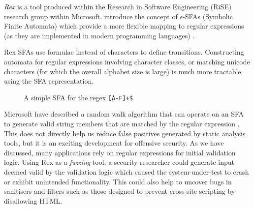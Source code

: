 \documentclass[a4paper,openany,12pt]{book}
\begin{document}
\emph{Rex} is a tool produced within the Research in Software Engineering (RiSE) research group within Microsoft.
\citeauthor{rex} introduce the concept of $\epsilon$-SFAs (Symbolic Finite Automata) which provide a more flexible
mapping to regular expressions (as they are implemented in modern programming languages) \citep{rex}.

Rex SFAs use formulae instead of characters to define transitions.
Constructing automata for regular expressions involving character classes, or matching unicode characters (for which
the overall alphabet size is large) is much more tractable using the SFA representation.

\begin{figure}[H]
    \begin{MyMdframed}
        \vspace{0.5em}
        \caption{\label{figure:sfa:1} A simple SFA for the regex \texttt{\^[A-F]+\$}}
        \vspace{0.5em}
        \captionsetup{style=default}


        \vspace{0.5em}
    \end{MyMdframed}
\end{figure}

Microsoft have described a random walk algorithm that can operate on an SFA to generate valid string members that are
matched by the regular expression \citep{rexapp}.
This does not directly help us reduce false positives generated by static analysis tools, but it is an exciting
development for offensive security.
As we have discussed, many applications rely on regular expressions for initial validation logic.
Using Rex as a \emph{fuzzing} tool, a security researcher could generate input deemed valid by the validation logic
which caused the system-under-test to crash or exhibit unintended functionality.
This could also help to uncover bugs in sanitisers and filters such as those designed to prevent cross-site scripting by
disallowing HTML.
\end{document}
